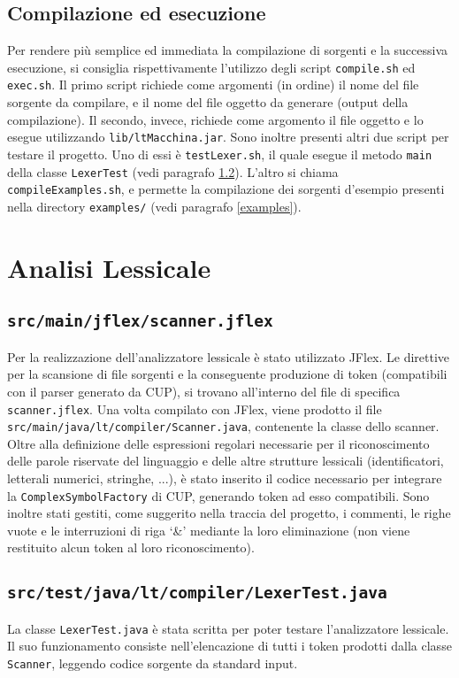 \documentclass[hidelinks,10pt,a4paper]{article}
\begin{document}
\subsection{Compilazione ed esecuzione}
Per rendere più semplice ed immediata la compilazione di sorgenti e la successiva esecuzione, si consiglia rispettivamente l'utilizzo degli script \texttt{compile.sh} ed \texttt{exec.sh}.
Il primo script richiede come argomenti (in ordine) il nome del file sorgente da compilare, e il nome del file oggetto da generare (output della compilazione).
Il secondo, invece, richiede come argomento il file oggetto e lo esegue utilizzando \texttt{lib/ltMacchina.jar}.
Sono inoltre presenti altri due script per testare il progetto.
Uno di essi è \texttt{testLexer.sh}, il quale esegue il metodo \texttt{main} della classe \texttt{LexerTest} (vedi paragrafo \ref{testLexer}).
L'altro si chiama \texttt{compileExamples.sh}, e permette la compilazione dei sorgenti d'esempio presenti nella directory \texttt{examples/} (vedi paragrafo \ref{examples}).

\section{Analisi Lessicale} \label{analisiLessicale}

\subsection{\texttt{src/main/jflex/scanner.jflex}} \label{lexer}
Per la realizzazione dell'analizzatore lessicale è stato utilizzato JFlex. Le direttive per la scansione di file sorgenti e la conseguente produzione di token (compatibili con il parser generato da CUP), si trovano all'interno del file di specifica \texttt{scanner.jflex}.
Una volta compilato con JFlex, viene prodotto il file \texttt{src/main/java/lt/compiler/Scanner.java}, contenente la classe dello scanner.
Oltre alla definizione delle espressioni regolari necessarie per il riconoscimento delle parole riservate del linguaggio e delle altre strutture lessicali (identificatori, letterali numerici, stringhe, ...), è stato inserito il codice necessario per integrare la \texttt{ComplexSymbolFactory} di CUP, generando token ad esso compatibili.
Sono inoltre stati gestiti, come suggerito nella traccia del progetto, i commenti, le righe vuote e le interruzioni di riga `\&' mediante la loro eliminazione (non viene restituito alcun token al loro riconoscimento).

\subsection{\texttt{src/test/java/lt/compiler/LexerTest.java}} \label{testLexer}
La classe \texttt{LexerTest.java} è stata scritta per poter testare l'analizzatore lessicale.
Il suo funzionamento consiste nell'elencazione di tutti i token prodotti dalla classe \texttt{Scanner}, leggendo codice sorgente da standard input.
\end{document}
